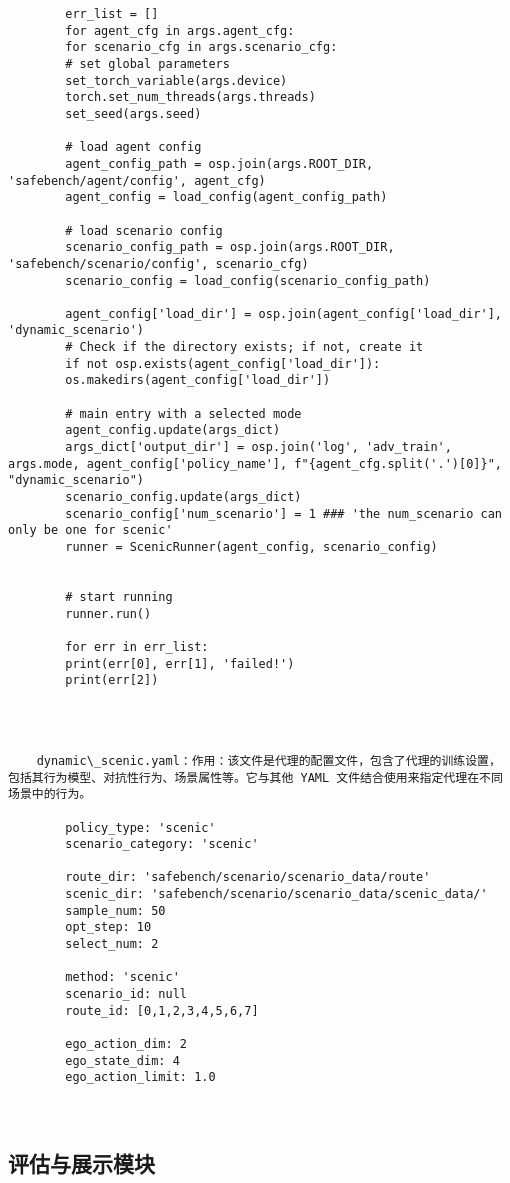 \begin{lstlisting}
		err_list = []
		for agent_cfg in args.agent_cfg:
		for scenario_cfg in args.scenario_cfg:
		# set global parameters
		set_torch_variable(args.device)
		torch.set_num_threads(args.threads)
		set_seed(args.seed)
		
		# load agent config
		agent_config_path = osp.join(args.ROOT_DIR, 'safebench/agent/config', agent_cfg)
		agent_config = load_config(agent_config_path)
		
		# load scenario config
		scenario_config_path = osp.join(args.ROOT_DIR, 'safebench/scenario/config', scenario_cfg)
		scenario_config = load_config(scenario_config_path)
		
		agent_config['load_dir'] = osp.join(agent_config['load_dir'], 'dynamic_scenario')
		# Check if the directory exists; if not, create it
		if not osp.exists(agent_config['load_dir']):
		os.makedirs(agent_config['load_dir'])        
		
		# main entry with a selected mode
		agent_config.update(args_dict)
		args_dict['output_dir'] = osp.join('log', 'adv_train', args.mode, agent_config['policy_name'], f"{agent_cfg.split('.')[0]}", "dynamic_scenario")
		scenario_config.update(args_dict)
		scenario_config['num_scenario'] = 1 ### 'the num_scenario can only be one for scenic'
		runner = ScenicRunner(agent_config, scenario_config)
		
		
		# start running
		runner.run()
		
		for err in err_list:
		print(err[0], err[1], 'failed!')
		print(err[2])
		
		
		
	\end{lstlisting}
\begin{lstlisting}
	dynamic\_scenic.yaml：作用：该文件是代理的配置文件，包含了代理的训练设置，包括其行为模型、对抗性行为、场景属性等。它与其他 YAML 文件结合使用来指定代理在不同场景中的行为。

		policy_type: 'scenic'
		scenario_category: 'scenic'
		
		route_dir: 'safebench/scenario/scenario_data/route'
		scenic_dir: 'safebench/scenario/scenario_data/scenic_data/'
		sample_num: 50
		opt_step: 10
		select_num: 2
		
		method: 'scenic'
		scenario_id: null
		route_id: [0,1,2,3,4,5,6,7]
		
		ego_action_dim: 2
		ego_state_dim: 4
		ego_action_limit: 1.0
		
		
\end{lstlisting}

\subsection*{评估与展示模块}

